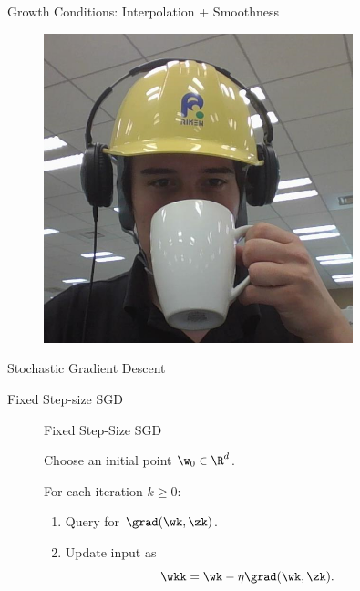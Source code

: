 \documentclass[mathserif,notheorems, hyperref={colorlinks, citecolor=blue, urlcolor=blue, linkcolor=blue}]{beamer}
\def\\{}%
\begin{document}
\begin{frame}{Growth Conditions: Interpolation + Smoothness}
\begin{center}
\begin{minipage}[t]{0.15\textwidth}
\begin{figure}[t]
				\includegraphics[width=0.8\textwidth]{collaborators/fred}
			\end{figure}
		\end{minipage}
	\end{center}

\end{frame}


\begin{frame}
	\begin{center}
		\huge Stochastic Gradient Descent\\
	\end{center}
\end{frame}


\begin{frame}{Fixed Step-size SGD}

	\begin{figure}[t]
		\begin{procedure}{Fixed Step-Size SGD}
			\item Choose an initial point \( \w_0 \in \R^d \).
			\vspace{2ex}
			\item For each iteration \( k \geq 0 \):
			\begin{enumerate}
				\item Query \oracle{} for \( \grad(\wk, \zk) \).
				      \vspace{1ex}
				\item Update input as\vspace{-1ex}%
				      \[ \wkk = \wk - \eta \grad(\wk, \zk). \]
			\end{enumerate}
		\end{procedure}
	\end{figure}


\end{frame}
\end{document}
